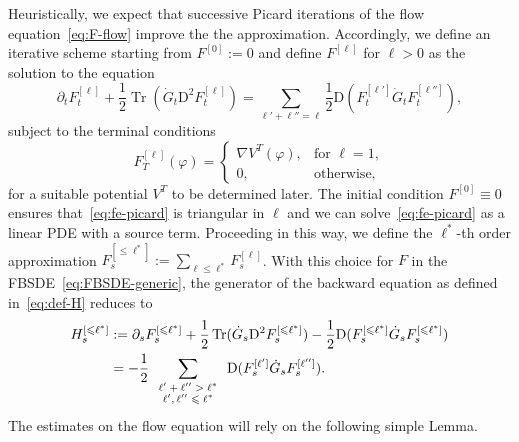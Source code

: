 \documentclass[11pt, a4paper]{scrartcl}
\numberwithin{equation}{section}
\theoremstyle{plain}
\theoremstyle{remark}
\newcommand{\assign}{:=}
\newcommand{\mathD}{\mathrm{D}}
\newcommand{\tmop}[1]{\ensuremath{\operatorname{#1}}}
\newcommand{\tmscript}[1]{\text{\scriptsize{$#1$}}}
\begin{document}
Heuristically, we expect that successive Picard iterations of the flow
equation~\eqref{eq:F-flow} improve the the approximation. Accordingly, we
define an iterative scheme starting from $F^{[0]} \assign 0$ and define
$F^{[\ell]}$ for $\ell > 0$ as the solution to the equation
\begin{equation}
  \partial_t F^{[\ell]}_t + \frac{1}{2} \tmop{Tr} (\dot{G}_t \mathD^2
  F^{[\ell]}_t) = \sum_{\ell' + \ell'' = \ell} \frac{1}{2} \mathD
  (F_t^{[\ell']}  \dot{G}_t F^{[\ell'']}_t), \label{eq:fe-picard}
\end{equation}
subject to the terminal conditions
\begin{equation}
  F^{[\ell]}_T (\varphi) = \begin{cases}
    \nabla V^T (\varphi), & \text{for } \ell = 1,\\
    0, & \text{otherwise,}
  \end{cases} \label{eq:fe-terminal-conditions}
\end{equation}
for a suitable potential $V^T$ to be determined later. The initial condition
$F^{[0]} \equiv 0$ ensures that~\eqref{eq:fe-picard} is triangular in $\ell$
and we can solve~\eqref{eq:fe-picard} as a linear PDE with a source term.
Proceeding in this way, we define the $\ell^{\ast}$-th order approximation
$F^{[\leqslant \ell^{\ast}]}_s \assign \sum_{\ell \leqslant \ell^{\ast}}
F^{[\ell]}_s$. With this choice for $F$ in the FBSDE~\eqref{eq:FBSDE-generic},
the generator of the backward equation as defined in~\eqref{eq:def-H} reduces
to
\begin{align*}
  H^{[\leqslant \ell^{\ast}]}_s 
  &\assign \partial_s F^{[\leqslant
  \ell^{\ast}]}_s + \frac{1}{2} \tmop{Tr} (\dot{G}_s \mathD^2 F^{[\leqslant
  \ell^{\ast}]}_s) - \frac{1}{2} \mathD (F^{[\leqslant \ell^{\ast}]}_s 
  \dot{G}_s F^{[\leqslant \ell^{\ast}]}_s) \\
  &= - \frac{1}{2} 
  \sum_{\tmscript{\begin{array}{c}
    \ell' + \ell'' > \ell^{\ast}\\
    \ell', \ell'' \leqslant \ell^{\ast}
  \end{array}}} \mathD (F_s^{[\ell']}  \dot{G}_s F^{[\ell'']}_s) .
  \label{eq:appr-H}
\end{align*}
The estimates on the flow equation will rely on the following simple Lemma.
\end{document}

